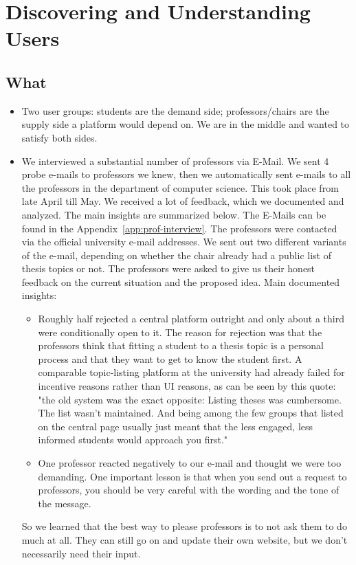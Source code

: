 \documentclass[11pt,a4paper]{article}
\begin{document}
\section{Discovering and Understanding Users}
\label{sec:users}

\subsection*{What}
\begin{itemize}
  \item Two user groups: students
 are the demand side; professors/chairs are the supply side a platform would
 depend on. We are in the middle and wanted to satisfy both sides.
  \item We interviewed a substantial number of professors via E-Mail.  We sent 4 probe e-mails to professors we knew, then we automatically sent e-mails to all the professors in the department of computer science. This took place from late April till May.  We received a lot of feedback, which we documented and analyzed. The main insights are summarized below.
 The E-Mails can be found in the Appendix~\ref{app:prof-interview}. The professors were contacted via the official university e-mail addresses. We sent out two different variants of the e-mail, depending on whether the chair already had a public list of thesis topics or not. The professors were asked to give us their honest feedback on the current situation and the proposed idea.
 Main documented
 insights:
    \begin{itemize}
      \item Roughly half rejected a central platform outright and only about a
 third were conditionally open to it.
 The reason for rejection was that the professors think that fitting a student to a thesis topic is a personal process and that they want to get to know the student first.
 A comparable topic-listing platform at the university had already failed for incentive reasons rather than UI reasons, as can be seen by this quote: "the old system was the exact opposite: Listing theses was cumbersome. The list wasn’t maintained. And being among the few groups that listed on the central page usually just meant that the less engaged, less informed students would approach you first."
      \item One professor reacted negatively to our e-mail and thought we were too demanding. One important lesson is that when you send out a request to professors, you should be very careful with the wording and the tone of the message.
   
    \end{itemize}
 So we learned that the best way to please professors is to not ask them to do much at all. They can still go on and update their own website, but we don't necessarily need their input. 

 

  
\end{itemize}
\end{document}
